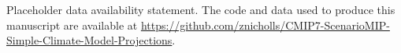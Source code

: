 Placeholder data availability statement.
The code and data used to produce this manuscript are available at
\url{https://github.com/znicholls/CMIP7-ScenarioMIP-Simple-Climate-Model-Projections}.
